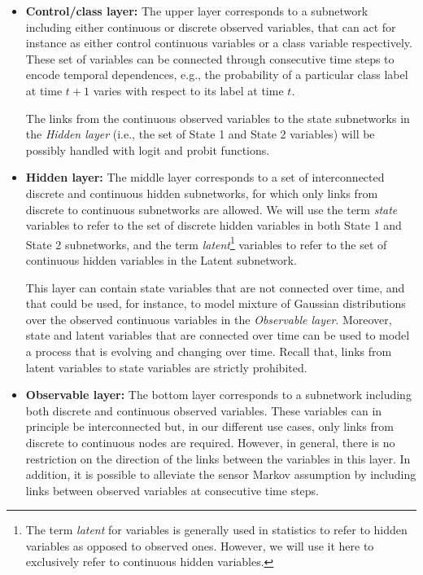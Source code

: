 \begin{itemize}

\item \textbf{Control/class layer:} The upper layer corresponds to a subnetwork including either continuous or discrete observed variables, that can act for instance as either control continuous variables or a class variable respectively. These set of variables can be connected through consecutive time steps to encode temporal dependences, e.g., the probability of a particular class label at time $t+1$ varies with respect to its label at time $t$. 

The links from the continuous observed variables to the state subnetworks in the \textit{Hidden layer} (i.e., the set of State 1 and State 2 variables) will be possibly handled with logit and probit functions.

\item \textbf{Hidden layer:}  The middle layer corresponds to a set of interconnected discrete and continuous hidden subnetworks, for which only links from discrete to continuous subnetworks are allowed. We will use the term \textit{state} variables to refer to the set of discrete hidden variables in both State 1 and State 2 subnetworks, and the term \textit{latent}\footnote{The term \textit{latent} for variables is generally used in statistics to refer to hidden variables as opposed to observed ones. However, we will use it here to exclusively refer to continuous hidden variables.} variables to refer to the set of continuous hidden variables in the Latent subnetwork.

This layer can contain state variables that are not connected over time, and that could be used, for instance, to model mixture of Gaussian distributions over the observed continuous variables in the \textit{Observable layer}. Moreover, state and latent variables that are connected over time can be used to model a process that is evolving and changing over time. Recall that, links from latent variables to state variables are strictly prohibited.

\item \textbf{Observable layer:} The bottom layer corresponds to a subnetwork including both discrete and continuous observed variables. These variables can in principle be interconnected but, in our different use cases, only links from discrete to continuous nodes are required. However, in general, there is no restriction on the direction of the links between the variables in this layer. In addition, it is possible to alleviate the sensor Markov assumption by including links between observed variables at consecutive time steps.

\end{itemize} 

